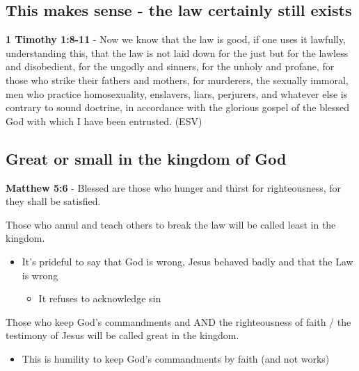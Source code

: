\documentclass[11pt]{article}
\begin{document}
\subsection{This makes sense - the law certainly still exists}
\label{sec:org345d68a}
\textbf{1 Timothy 1:8-11} -  Now we know that the law is good, if one uses it lawfully, understanding this, that the law is not laid down for the just but for the lawless and disobedient, for the ungodly and sinners, for the unholy and profane, for those who strike their fathers and mothers, for murderers, the sexually immoral, men who practice homosexuality, enslavers, liars, perjurers, and whatever else is contrary to sound doctrine, in accordance with the glorious gospel of the blessed God with which I have been entrusted.  (ESV)

\subsection{Great or small in the kingdom of God}
\label{sec:orgafbdc26}
\textbf{Matthew 5:6} - Blessed are those who hunger and thirst for righteousness, for they shall be satisfied.

Those who annul and teach others to break the law will be called least in the kingdom.
\begin{itemize}
\item It's prideful to say that God is wrong, Jesus behaved badly and that the Law is wrong
\begin{itemize}
\item It refuses to acknowledge sin
\end{itemize}
\end{itemize}
Those who keep God's commandments and AND the righteousness of faith / the testimony of Jesus will be called great in the kingdom.
\begin{itemize}
\item This is humility to keep God's commandments by faith (and not works)
\end{itemize}
\end{document}
